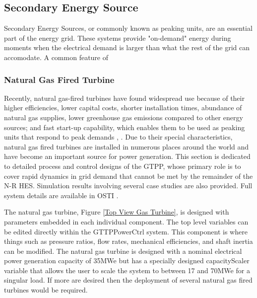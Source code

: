\subsection{Secondary Energy Source}
Secondary Energy Sources, or commonly known as peaking units, are an essential part of the energy grid. These systems provide "on-demand" energy during moments when the electrical demand is larger than what the rest of the grid can accomodate. A common feature of 

\subsubsection{Natural Gas Fired Turbine}

Recently, natural gas-fired turbines have found widespread use because of their higher efficiencies, lower capital costs, shorter installation times, abundance of natural gas supplies, lower greenhouse gas emissions compared to other energy sources; and fast start-up capability, which enables them to be used as peaking units that respond to peak demands \cite{GasTurbine2008}, \cite{GasTurbine2013}. Due to their special characteristics, natural gas fired turbines are installed in numerous places around the world and have become an important source for power generation. This section is dedicated to detailed process and control designs of the GTPP, whose primary role is to cover rapid dynamics in grid demand that cannot be met by the remainder of the N-R HES. Simulation results involving several case studies are also provided. Full system details are available in OSTI \cite{2016HTSE}.

The natural gas turbine, Figure \ref{Top View Gas Turbine}, is designed with parameters embedded in each individual component. The top level variables can be edited directly within the GTTP\textunderscore PowerCtrl system. This component is where things such as pressure ratios, flow rates, mechanical efficiencies, and shaft inertia can be modified. The natural gas turbine is designed with a nominal electrical power generation capacity of 35MWe but has a specially designed capacityScaler variable that allows the user to scale the system to between 17 and 70MWe for a singular load. If more are desired then the deployment of several natural gas fired turbines would be required. 

